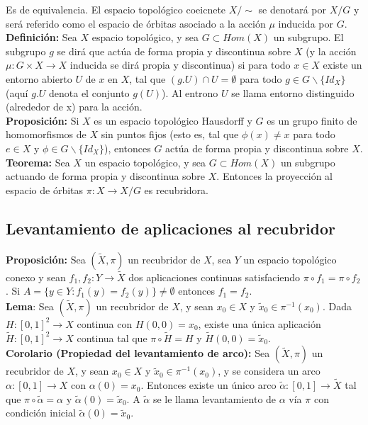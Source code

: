 \documentclass{article}
\begin{document}
Es de equivalencia. El espacio topológico coeicnete $X/\sim$ se denotará por $X/G$ y será referido como el espacio de órbitas asociado a la acción $\mu$ inducida por $G$. \\

\textbf{Definición:} Sea $X$ espacio topológico, y sea $G\subset Hom(X)$ un subgrupo. El subgrupo $g$ se dirá que actúa de forma propia y discontinua sobre $X$ (y la acción $\mu:G\times X\rightarrow X$ inducida se dirá propia y discontinua) si para todo $x\in X$ existe un entorno abierto $U$ de $x$ en $X$, tal que $(g.U)\cap U=\emptyset$ para todo $g\in G\backslash\{Id_X\}$ (aquí $g.U$ denota el conjunto $g(U)$). Al entrono $U$ se llama entorno distinguido (alrededor de x) para la acción. \\

\textbf{Proposición:} Si $X$ es un espacio topológico Hausdorff y $G$ es un grupo finito de homomorfismos de $X$ sin puntos fijos (esto es, tal que $\phi(x)\neq x$ para todo $e\in X$ y $\phi\in G\backslash\{Id_X\}$), entonces $G$ actúa de forma propia y discontinua sobre $X$.\\

\textbf{Teorema:} Sea $X$ un espacio topológico, y sea $G\subset Hom(X)$ un subgrupo actuando de forma propia y discontinua sobre $X$. Entonces la proyección al espacio de órbitas $\pi:X\rightarrow X/G$ es recubridora.

\subsection{Levantamiento de aplicaciones al recubridor}
\textbf{Proposición:} Sea $(\tilde{X},\pi)$ un recubridor de $X$, sea $Y$ un espacio topológico conexo y sean $f_1,f_2:Y\rightarrow \tilde{X}$ dos aplicaciones continuas satisfaciendo $\pi\circ f_1=\pi\circ f_2$. Si $A=\{y\in Y:f_1(y)=f_2(y)\}\neq\emptyset$ entonces $f_1=f_2$. \\

\textbf{Lema}: Sea $(\tilde{X},\pi)$ un recubridor de $X$, y sean $x_0\in X$ y $\tilde{x}_0\in \pi^{-1}(x_0)$. Dada $H:[0,1]^2\rightarrow X$ continua con $H(0,0)=x_0$, existe una única aplicación $\tilde{H}:[0,1]^2\rightarrow X$ continua tal que $\pi\circ \tilde{H}=H$ y $\tilde{H}(0,0)=\tilde{x}_0$.\\

\textbf{Corolario (Propiedad del levantamiento de arco):} Sea $(\tilde{X},\pi)$ un recubridor de $X$, y sean $x_0\in X$ y $\tilde{x}_0\in \pi^{-1}(x_0)$, y se considera un arco $\alpha:[0,1]\rightarrow X$ con $\alpha(0)=x_0$. Entonces existe un único arco $\tilde{\alpha}:[0,1]\rightarrow \tilde{X}$ tal que $\pi\circ\tilde{\alpha}=\alpha$ y $\tilde{\alpha}(0)=\tilde{x}_0$. A $\tilde{\alpha}$ se le llama levantamiento de $\alpha$ vía $\pi$ con condición inicial $\tilde{\alpha}(0)=\tilde{x}_0$.\\
\end{document}
